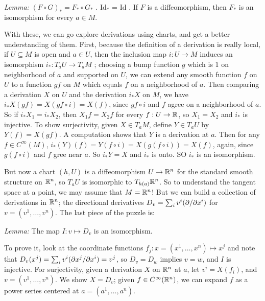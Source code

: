 \ssk

{\it Lemma:} $(F\circ G)_*=F_*\circ G_*$ . Id$_*$ = Id . If $F$ is a diffeomorphism, then 
$F_*$ is an isomorphism for every $a\in M$.

\ssk

With these, we can go explore derivations using charts, and get a better understanding of them.
First, because the definition of a derivation is really local, if $U\subseteq M$ is open 
and $a\in U$, then the inclusion map $i:U\rightarrow M$ induces an isomorphism
$i_*:T_aU\rightarrow T_aM$ ; choosing a bump function $g$ which is $1$ on  neighborhood
of $a$ and supported on $U$, we can extend any smooth function $f$ on $U$ to a function $gf$ on $M$
which equals $f$ on a neighborhood of $a$.
Then comparing a derivation $X$ on $U$ and the derivation $i_*X$ on $M$, 
we have $i_*X(gf)=X(gf\circ i)=X(f)$, since $gf\circ i$ and $f$ agree on a neighborhood of $a$.
So if $i_*X_1=i_*X_2$, then $X_1f=X_2f$ for every $f:U\rightarrow {\Bbb R}$, so $X_1=X_2$ and $i_*$ is injective.
To show surjectivity, given $X\in T_aM$, define $Y\in T_aU$ by $Y(f)=X(gf)$. A computation shows that $Y$ is a 
derivation at $a$. Then for any $f\in C^\infty(M)$, $i_*(Y)(f)=Y(f\circ i) = X(g(f\circ i)) = X(f)$,
again, since $g(f\circ i)$ and $f$ gree near $a$. So $i_*Y=X$ and $i_*$ is onto. SO $i_*$ is an
isomorphism.

But now a chart $(h,U)$ is a diffeomorphism $U\rightarrow {\Bbb R}^n$ for the standard smooth structure on
${\Bbb R}^n$, so $T_aU$ is isomorphic to $T_{h(a)}{\Bbb R}^n$. So to understand the tangent space
at a point, we may assume that $M={\Bbb R}^n$! But we can build a collection of derivations in
${\Bbb R}^n$; the directional derivatives $D_v=\sum_i v^i(\partial/\partial x^i)$ for $v=(v^1,\ldots ,v^n)$.
The last piece of the puzzle is:

\ssk

{\it Lemma:} The map $I:v\mapsto D_v$ is an isomorphism.

\ssk

To prove it, look at the coordinate functions $f_j:x=(x^1,\ldots ,x^n)\mapsto x^j$ and note that
 $D_v(x^j)=\sum_i v^i(\partial x^j/\partial x^i)=v^j$, so $D_v=D_w$ implies $v=w$,
and $I$ is injective. For surjectivity, given a derivation $X$ on ${\Bbb R}^n$ at $a$,
let $v^i=X(f_i)$, and $v=(v^1,\ldots ,v^n)$. We show $X=D_v$; given $f\in C^\infty({\Bbb R}^n)$, we
can expand $f$ as a power series centered at $a=(a^1,\ldots ,a^n)$. 

\ssk


